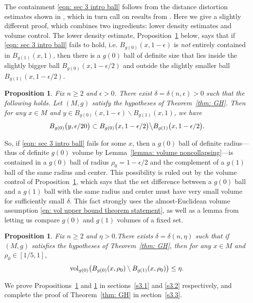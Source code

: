 \documentclass[11pt,reqno]{amsart}
\newtheorem{proposition}[theorem]{Proposition}
\theoremstyle{remark}
\theoremstyle{definition}
\numberwithin{equation}{section}
\newcommand{\e}{{\epsilon}}
\newcommand{\vol}{{\rm{vol}}}
\begin{document}
The containment  \eqref{eqn: sec 3 intro ball} follows from the distance distortion estimates shown in \cite{BingWangB}, which in turn call on results from \cite{TianWang}. Here we give a slightly different proof, which combines two ingredients: lower density estimates and volume control. The lower density estimate, Proposition~\ref{prop: lower density estimate} below, says that if \eqref{eqn: sec 3 intro ball} fails to hold, i.e. $B_{g(0)}(x,1-\e)$ is {\it not} entirely contained in $B_{g(1)}(x,1)$, 
 then there is a $g(0)$ ball of definite size that lies inside the slightly bigger ball $B_{g(0)}(x,1-\e/2)$ and outside the slightly smaller ball $B_{g(1)}(x, 1-\e/2)$.
\begin{proposition} \label{prop: lower density estimate}
Fix $n\geq 2$ and $\e>0$. There exist $\delta = \delta(n,\e)>0$ such that the following holds. Let $(M,g)$ satisfy the hypotheses of Theorem~\ref{thm: GH}.
Then for any $x \in M$ and $y \in B_{g(0)}\left(x, 1-\e\right) \backslash B_{g(1)}\left(x, 1\right)$, we have 
\[
B_{g(0)}\big(y, \e/ 20\big) \subset B_{g(0)}\big(x, 1-\e/2\big) \big\backslash B_{g(1)}\big(x, 1-\e / 2\big).
\]
\end{proposition}
So, if \eqref{eqn: sec 3 intro ball} fails  for some $x$, then a  $g(0)$ ball of definite radius---thus of definite $g(0)$ volume by Lemma~\ref{lemma: volume noncollapsing}---is contained in a $g(0)$ ball of radius $\rho_0=1-\e/2$ and the complement of a $g(1)$ ball of the same radius and center.  This possibility is ruled out by the volume control of Proposition~\ref{prop: volume control}, which says that the set difference between a $g(0)$ ball and a $g(1)$ ball with the same radius and center must have very small volume for sufficiently small $\delta.$ This fact strongly uses the almost-Euclidean volume assumption \eqref{en: vol upper bound theorem statement}, as well as a lemma from \cite{LNN1} letting us compare $g(0)$ and $g(1)$ volumes of a fixed set.
%
\begin{proposition}\label{prop: volume control}
	Fix $n\geq 2$ and $\eta >0$.There exists $\delta = \delta (n,\eta)$ such that if $(M,g)$ satisfies the hypotheses of Theorem~\ref{thm: GH}, then for any $x \in M$ and $\rho_0 \in [1/5,1]$, 
	\begin{equation}
	\label{claim 1}
\vol_{g(0)} \big(B_{g(0)}(x, \rho_0) \setminus B_{g(1)}(x, \rho_0)\big)  \leq \eta.
\end{equation}
\end{proposition}
We prove Propositions~\ref{prop: lower density estimate} and \ref{prop: volume control} in sections~\ref{s3.1} and \ref{s3.2} respectively, and complete the proof of Theorem~\ref{thm: GH} in section~\ref{s3.3}. 
\end{document}
